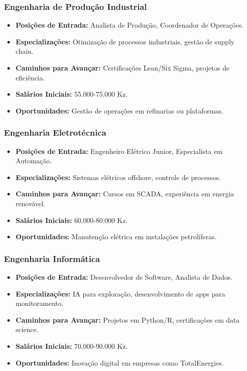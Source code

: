 \documentclass[12pt]{article}
\begin{document}
\subsubsection{Engenharia de Produção Industrial}
\begin{itemize}
    \item \textbf{Posições de Entrada:} Analista de Produção, Coordenador de Operações.
    \item \textbf{Especializações:} Otimização de processos industriais, gestão de supply chain.
    \item \textbf{Caminhos para Avançar:} Certificações Lean/Six Sigma, projetos de eficiência.
    \item \textbf{Salários Iniciais:} 55.000-75.000 Kz.
    \item \textbf{Oportunidades:} Gestão de operações em refinarias ou plataformas.
\end{itemize}

\subsubsection{Engenharia Eletrotécnica}
\begin{itemize}
    \item \textbf{Posições de Entrada:} Engenheiro Elétrico Junior, Especialista em Automação.
    \item \textbf{Especializações:} Sistemas elétricos offshore, controle de processos.
    \item \textbf{Caminhos para Avançar:} Cursos em SCADA, experiência em energia renovável.
    \item \textbf{Salários Iniciais:} 60.000-80.000 Kz.
    \item \textbf{Oportunidades:} Manutenção elétrica em instalações petrolíferas.
\end{itemize}

\subsubsection{Engenharia Informática}
\begin{itemize}
    \item \textbf{Posições de Entrada:} Desenvolvedor de Software, Analista de Dados.
    \item \textbf{Especializações:} IA para exploração, desenvolvimento de apps para monitoramento.
    \item \textbf{Caminhos para Avançar:} Projetos em Python/R, certificações em data science.
    \item \textbf{Salários Iniciais:} 70.000-90.000 Kz.
    \item \textbf{Oportunidades:} Inovação digital em empresas como TotalEnergies.
\end{itemize}
\end{document}
